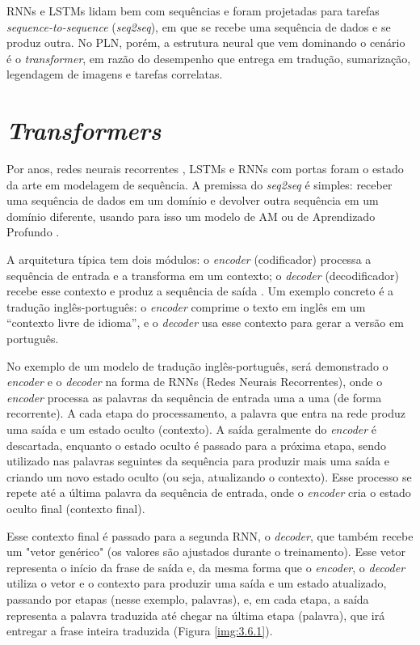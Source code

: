 RNNs e LSTMs lidam bem com sequências e foram projetadas para tarefas \textit{sequence-to-sequence} (\textit{seq2seq}), em que se recebe uma sequência de dados e se produz outra. No PLN, porém, a estrutura neural que vem dominando o cenário é o \textit{transformer}, em razão do desempenho que entrega em tradução, sumarização, legendagem de imagens e tarefas correlatas.


\section{\textit{Transformers}}

Por anos, redes neurais recorrentes \cite{goodfellow2016}, LSTMs \cite{hochreiter1997} e RNNs com portas \cite{chung2014} foram o estado da arte em modelagem de sequência. A premissa do \textit{seq2seq} é simples: receber uma sequência de dados em um domínio e devolver outra sequência em um domínio diferente, usando para isso um modelo de AM ou de Aprendizado Profundo \cite{sutskever2014}.

A arquitetura típica tem dois módulos: o \textit{encoder} (codificador) processa a sequência de entrada e a transforma em um contexto; o \textit{decoder} (decodificador) recebe esse contexto e produz a sequência de saída \cite{sutskever2014}. Um exemplo concreto é a tradução inglês-português: o \textit{encoder} comprime o texto em inglês em um ``contexto livre de idioma'', e o \textit{decoder} usa esse contexto para gerar a versão em português.

No exemplo de um modelo de tradução inglês-português, será demonstrado o \textit{encoder} e o \textit{decoder} na forma de RNNs (Redes Neurais Recorrentes), onde o \textit{encoder} processa as palavras da sequência de entrada uma a uma (de forma recorrente). A cada etapa do processamento, a palavra que entra na rede produz uma saída e um estado oculto (contexto). A saída geralmente do \textit{encoder} é descartada, enquanto o estado oculto é passado para a próxima etapa, sendo utilizado nas palavras seguintes da sequência para produzir mais uma saída e criando um novo estado oculto (ou seja, atualizando o contexto). Esse processo se repete até a última palavra da sequência de entrada, onde o \textit{encoder} cria o estado oculto final (contexto final).

Esse contexto final é passado para a segunda RNN, o \textit{decoder}, que também recebe um "vetor genérico" (os valores são ajustados durante o treinamento). Esse vetor representa o início da frase de saída e, da mesma forma que o \textit{encoder}, o \textit{decoder} utiliza o vetor e o contexto para produzir uma saída e um estado atualizado, passando por etapas (nesse exemplo, palavras), e, em cada etapa, a saída representa a palavra traduzida até chegar na última etapa (palavra), que irá entregar a frase inteira traduzida (Figura \ref{img:3.6.1}).

